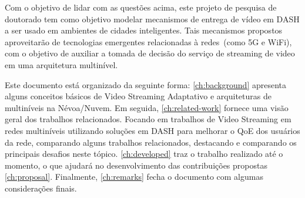 




Com o objetivo de lidar com as questões acima, este projeto de pesquisa de doutorado tem como objetivo modelar mecanismos de entrega de vídeo em DASH %
a ser usado em ambientes de cidades inteligentes. Tais mecanismos propostos aproveitarão de tecnologias emergentes relacionadas à redes~(como 5G e WiFi), com o objetivo de auxiliar a tomada de decisão do serviço de streaming de video em uma arquitetura multinível. %

Este documento está organizado da seguinte forma: \autoref{ch:background} apresenta
alguns conceitos básicos de Video Streaming Adaptativo e arquiteturas de multiníveis na Névoa/Nuvem. Em seguida, \autoref{ch:related-work} fornece uma visão geral dos trabalhos relacionados. Focando em trabalhos de Video Streaming em redes multiníveis utilizando soluções em DASH para melhorar o QoE dos usuários da rede, comparando alguns trabalhos relacionados, destacando e comparando os principais desafios neste tópico. \autoref{ch:developed} traz o trabalho realizado até o momento, o que ajudará no desenvolvimento das contribuições propostas \autoref{ch:proposal}. Finalmente, \autoref{ch:remarks} fecha o documento com algumas considerações finais.
 
